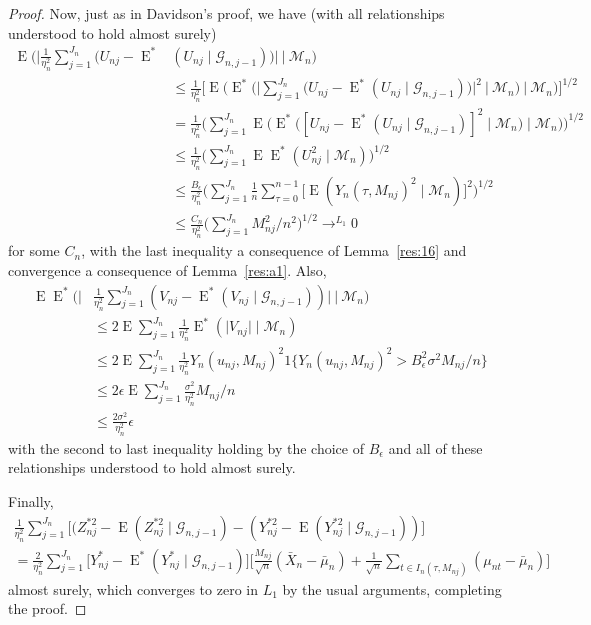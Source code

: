 \documentclass[11pt]{article}
\theoremstyle{definition}
\DeclareMathOperator{\E}{E}
\begin{document}
\begin{proof}
  Now, just as in Davidson's proof, we have (with all relationships
  understood to hold almost surely)
  \begin{align*}
    \E\Big(\Big|\tfrac{1}{\eta_n^2} \sum_{j=1}^{J_n} \big(U_{nj} - \E^{*}& (U_{nj} \mid \mathcal{G}_{n,j-1})\big) \Big| \ \Big|\ \mathcal{M}_n\Big)\\
    &\leq \tfrac{1}{\eta_n^2}\Big[\E\Big( \E^{*} \Big( \Big|\sum_{j=1}^{J_n} \big(U_{nj} 
     - \E^{*}(U_{nj} \mid \mathcal{G}_{n,j-1})\big) \Big|^2 \ \Big|\ \mathcal{M}_n\Big)\ \Big|\ \mathcal{M}_n\Big)\Big]^{1/2}
    \\ &= \tfrac{1}{\eta_n^2} \Big(\sum_{j=1}^{J_n} \E\big(\E^{*}\big([U_{nj} - \E^{*}(U_{nj} \mid \mathcal{G}_{n,j-1})]^2\mid \mathcal{M}_{n} \big) \mid \mathcal{M}_n\big) \Big)^{1/2} 
    \\ &\leq \tfrac{1}{\eta_n^2} \Big(\sum_{j=1}^{J_n} \E \E^{*}(U_{nj}^2 \mid \mathcal{M}_n) \Big)^{1/2} 
    \\ & \leq \tfrac{B_{\epsilon}}{\eta_n^2} \Big(\sum_{j=1}^{J_n} \tfrac{1}{n} \sum_{\tau=0}^{n-1} \Big[\E(Y_n(\tau, M_{nj})^2 \mid \mathcal{M}_n)\Big]^2\Big)^{1/2}
    \\ & \leq \tfrac{C_n}{\eta_n^2} \Big(\sum_{j=1}^{J_n} M_{nj}^2 / n^2\Big)^{1/2} \to^{L_1} 0
  \end{align*}
  for some $C_n$, with the last inequality a consequence of Lemma~\ref{res:16}
  and convergence a consequence of Lemma~\ref{res:a1}.  Also,
  \begin{align*}
    \E \E^{*}\Big(\Big\lvert &\tfrac{1}{\eta_n^2} \sum_{j=1}^{J_n} (V_{nj} -
      \E^{*}(V_{nj} \mid \mathcal{G}_{n,j-1})) \Big\rvert \ \Big|\ \mathcal{M}_n \Big)
    \\ & \leq 2 \E \sum_{j=1}^{J_n} \tfrac{1}{\eta_n^2} \E^{*}(\lvert V_{nj} \rvert \mid \mathcal{M}_n)
    \\ & \leq 2 \E \sum_{j=1}^{J_n} \tfrac{1}{\eta_n^2} Y_n(u_{nj}, M_{nj})^2
    1\big\{Y_n(u_{nj}, M_{nj})^2 > B^2_{\epsilon} \sigma^2 M_{nj}/n \big\}
    \\ & \leq 2 \epsilon \E \sum_{j=1}^{J_n} \tfrac{\sigma^2}{\eta_n^2} M_{nj} / n
    \\ & \leq \tfrac{2\sigma^2}{\eta_n^2} \epsilon
  \end{align*}
  with the second to last inequality holding by the choice of
  $B_{\epsilon}$ and all of these relationships understood to hold
  almost surely.

  Finally, 
  \begin{multline*}
    \tfrac{1}{\eta_n^2} \sum_{j=1}^{J_n} \big[(Z_{nj}^{*2} - \E(Z_{nj}^{*2} \mid \mathcal{G}_{n,j-1}) - (Y_{nj}^{*2} - \E(Y_{nj}^{*2} \mid \mathcal{G}_{n,j-1}))\big] \\
    = \tfrac{2}{\eta_n^2} \sum_{j=1}^{J_n} \big[Y_{nj}^{*} - \E^{*}(Y_{nj}^{*} \mid \mathcal{G}_{n,j-1})]
    \Big[\tfrac{M_{nj}}{\sqrt{n}} (\bar{X}_n - \bar{\mu}_n) + \tfrac{1}{\sqrt{n}} \sum_{t \in I_n(\tau, M_{nj})} (\mu_{nt} - \bar{\mu}_n)\Big]
  \end{multline*}
  almost surely, which converges to zero in $L_1$ by the usual arguments, completing the proof.
\end{proof}
\end{document}
